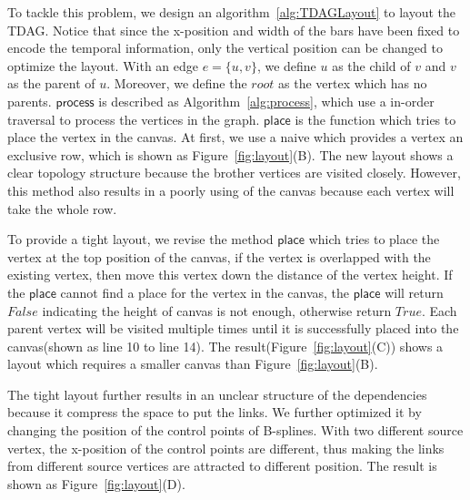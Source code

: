To tackle this problem, we design an algorithm~\ref{alg:TDAGLayout} to layout the TDAG. Notice that since the x-position and width of the bars have been fixed to encode the temporal information, only the vertical position can be changed to optimize the layout. With an edge $e=\{u,v\}$, we define $u$ as the child of $v$ and $v$ as the parent of $u$. Moreover, we define the $root$ as the vertex which has no parents. $\mathsf{process}$ is described as Algorithm~\ref{alg:process}, which use a in-order traversal to process the vertices in the graph.  $\mathsf{place}$ is the function which tries to place the vertex in the canvas. At first, we use a naive which provides a vertex an exclusive row, which is shown as Figure~\ref{fig:layout}(B). The new layout shows a clear topology structure because the brother vertices are visited closely. However, this method also results in a poorly using of the canvas because each vertex will take the whole row.  

To provide a tight layout, we revise the method $\mathsf{place}$ which tries to place the vertex at the top position of the canvas, if the vertex is overlapped with the existing vertex, then move this vertex down the distance of the vertex height. If the $\mathsf{place}$ cannot find a place for the vertex in the canvas, the $\mathsf{place}$ will return $False$ indicating the height of canvas is not enough, otherwise return $True$. Each parent vertex will be visited multiple times until it is successfully placed into the canvas(shown as line 10 to line 14). The result(Figure~\ref{fig:layout}(C)) shows a layout which requires a smaller canvas than Figure~\ref{fig:layout}(B).

The tight layout further results in an unclear structure of the dependencies because it compress the space to put the links. We further optimized it by changing the position of the control points of B-splines. With two different source vertex, the x-position of the control points are different, thus making the links from different source vertices are attracted to different position. The result is shown as Figure~\ref{fig:layout}(D).

